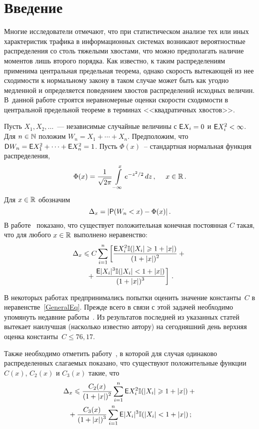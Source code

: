       \begin{multicols}{2}
      
            \label{st\stat}


\section{Введение}

Многие исследователи отмечают, что при статистическом анализе тех
или иных характеристик трафика в информационных системах возникают
вероятностные распределения со столь тяжелыми хвостами, что можно
предполагать наличие моментов лишь второго порядка. Как известно, к
таким распределениям применима центральная предельная теорема,
однако скорость вытекающей из нее сходимости к нормальному закону в
таком случае может быть как угодно медленной и определяется
поведением хвостов распределений исходных величин. В~данной работе
строятся неравномерные оценки скорости сходимости в центральной
предельной теореме в терминах <<квадратичных хвос\-тов>>.


Пусть $X_1,X_2,\ldots$~--- независимые случайные величины с ${\sf E}
X_i=0$ и ${\sf E} X_i^2<\infty$. Для $n\in\mathbb N$ положим
$W_n=X_1+\cdots+X_n.$ Предположим, что ${\sf D} W_n={\sf E} X_1^2+\cdots+{\sf E}
X_n^2=1$. Пусть $\Phi(x)$~-- стандартная нормальная функция
распределения,
$$
\Phi(x)=\displaystyle\frac{\displaystyle 1\mathstrut}{\displaystyle \sqrt{2\pi}\mathstrut}\int\limits_{-\infty}^{x}e^{-z^2/2}\,dz\,,\
\ \ \ x\in\mathbb R\,.
$$
Для $x\in\mathbb R$ обозначим
$$
\Delta_x=|{\sf P}(W_n<x)-\Phi(x)|\,.
$$
В работе~\cite{ChSh2001} показано, что существует положительная
конечная постоянная $C$ такая, что для любого $x\in\mathbb R$ выполнено
неравенство:
\begin{multline}
\label{GeneralEq}
\Delta_x\leqslant C\sum\limits_{i=1}^n\left[\displaystyle\frac{\displaystyle {\sf E} X_i^2\mathbb{I}(|X_i|\geqslant
1+|x|)\mathstrut}{\displaystyle (1+|x|)^2\mathstrut}+{}\right.\\
\left.{}+\displaystyle\frac{\displaystyle {\sf E} |X_i|^3\mathbb{I}(|X_i|<
1+|x|)\mathstrut}{\displaystyle (1+|x|)^3\mathstrut}\right]\,.
\end{multline}

В некоторых работах предпринимались попытки оценить значение
константы~$C$ в неравенстве~\eqref{GeneralEq}. Прежде всего в связи с этой
задачей необходимо упомянуть недавние работы~\cite{TN2007, NT2007}. 
Из результатов последней из указанных статей вытекает
наилучшая (насколько известно автору) на сегодняшний день верхняя
оценка константы~$C\leqslant 76{,}17$.

Также необходимо отметить работу~\cite{KP2011_Neam}, в которой для
случая одинаково распределенных слагаемых показано, что
существуют положительные функции $C(x)$, $C_2(x)$ и $C_3(x)$
такие, что
\begin{multline*}
\Delta_x\leqslant \displaystyle\frac{\displaystyle C_2(x)\mathstrut}{\displaystyle (1+|x|)^2\mathstrut}\sum\limits_{i=1}^n{\sf E}
X_i^2\mathbb{I}(|X_i|\geqslant 1+|x|)+{}\\
{}+\displaystyle\frac{\displaystyle C_3(x)\mathstrut}{\displaystyle (1+|x|)^3\mathstrut}\sum\limits_{i=1}^n{\sf E}
|X_i|^3\mathbb{I}(|X_i|< 1+|x|)\,;
\end{multline*}


\end{multicols}
